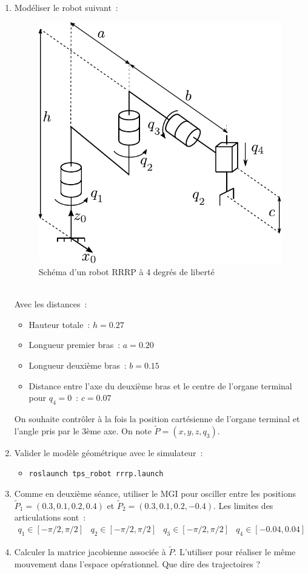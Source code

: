 \documentclass[12pt,a4paper]{article}
\begin{document}
\begin{enumerate}
\item Modéliser le robot suivant~:
\begin{figure}[h]
\centering
\includegraphics[width=.4\linewidth]{RRRP}
\caption{Schéma d'un robot RRRP à 4 degrés de liberté}
\label{fig:3RP}
\end{figure}\\
Avec les distances~:
\begin{itemize}
\item Hauteur totale~: $h=0.27$
\item Longueur premier bras~: $a=0.20$
\item Longueur deuxième bras~: $b = 0.15$
\item Distance entre l'axe du deuxième bras et le centre de l'organe terminal pour $q_4=0$~: $c=0.07$
\end{itemize}
On souhaite contrôler à la fois la position cartésienne de l'organe terminal et l'angle pris par le 3ème axe. On note $\tilde{P} = (x,y,z,q_3)$.\\

\item Valider le modèle géométrique avec le simulateur~:
\begin{itemize}
\item \texttt{roslaunch tps\_robot rrrp.launch}
\end{itemize}
\item 
Comme en deuxième séance, utiliser le MGI pour osciller entre les positions $\tilde{P}_1=(0.3,0.1,0.2,0.4)$ et $\tilde{P}_2=(0.3,0.1,0.2,-0.4)$.
Les limites des articulations sont~:
\begin{equation*}
\begin{array}{cccc}
q_1\in[-\pi/2,\pi/2] & q_2 \in [-\pi/2,\pi/2] & q_3\in[-\pi/2,\pi/2] & q_4\in[-0.04,0.04]
\end{array}
\end{equation*}
\item Calculer la matrice jacobienne associée à $\tilde{P}$. L'utiliser pour réaliser le même mouvement dans l'espace opérationnel. Que dire des trajectoires ?
\end{enumerate}
\end{document}
